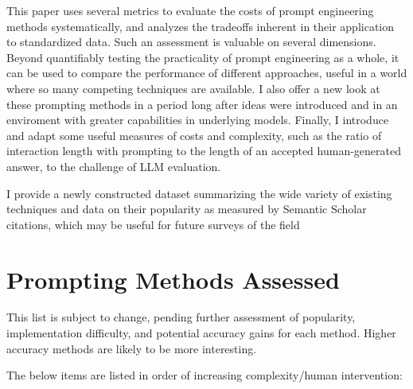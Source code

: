 \documentclass[11pt]{article}
\begin{document}
This paper uses several metrics to evaluate the costs of prompt engineering methods systematically, and analyzes the tradeoffs inherent in their application to standardized data. Such an assessment is valuable on several dimensions. Beyond quantifiably testing the practicality of prompt engineering as a whole, it can be used to compare the performance of different approaches, useful in a world where so many competing techniques are available. I also offer a new look at these prompting methods in a period long after ideas were introduced and in an enviroment with greater capabilities in underlying models. Finally, I introduce and adapt some useful measures of costs and complexity, such as the ratio of interaction length with prompting to the length of an accepted human-generated answer, to the challenge of LLM evaluation.

I provide a newly constructed dataset summarizing the wide variety of existing techniques and data on their popularity as measured by Semantic Scholar citations, which may be useful for future surveys of the field

\section*{Prompting Methods Assessed}

This list is subject to change, pending further assessment of popularity, implementation difficulty, and potential accuracy gains for each method. Higher accuracy methods are likely to be more interesting.

The below items are listed in order of increasing complexity/human intervention:
\end{document}
